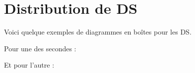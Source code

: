 \section{Distribution de DS}

Voici quelque exemples de diagrammes en boîtes pour les DS.

Pour une des secondes :
\begin{center}
   
\end{center}

Et pour l'autre :
\begin{center}
   
\end{center}
